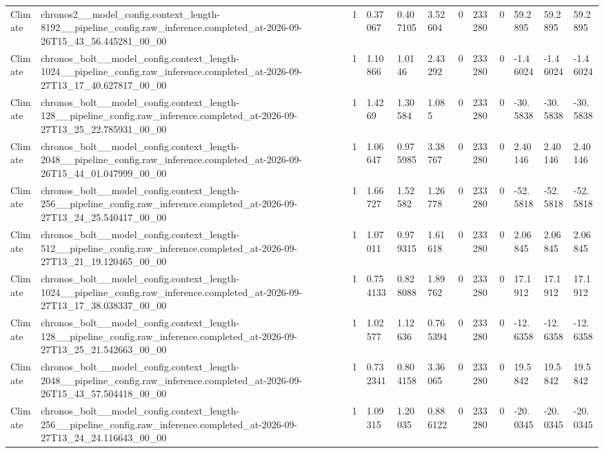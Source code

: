 \begin{tabular}{llllllllllll}
Climate & chronos2\_\_model\_config.context\_length-8192\_\_pipeline\_config.raw\_inference.completed\_at-2026-09-26T15\_43\_56.445281\_00\_00 & 1 & 0.37067 & 0.407105 & 3.52604 & 0 & 233280 & 0 & 59.2895 & 59.2895 & 59.2895 \\
Climate & chronos\_bolt\_\_model\_config.context\_length-1024\_\_pipeline\_config.raw\_inference.completed\_at-2026-09-27T13\_17\_40.627817\_00\_00 & 1 & 1.10866 & 1.0146 & 2.43292 & 0 & 233280 & 0 & -1.46024 & -1.46024 & -1.46024 \\
Climate & chronos\_bolt\_\_model\_config.context\_length-128\_\_pipeline\_config.raw\_inference.completed\_at-2026-09-27T13\_25\_22.785931\_00\_00 & 1 & 1.4269 & 1.30584 & 1.085 & 0 & 233280 & 0 & -30.5838 & -30.5838 & -30.5838 \\
Climate & chronos\_bolt\_\_model\_config.context\_length-2048\_\_pipeline\_config.raw\_inference.completed\_at-2026-09-26T15\_44\_01.047999\_00\_00 & 1 & 1.06647 & 0.975985 & 3.38767 & 0 & 233280 & 0 & 2.40146 & 2.40146 & 2.40146 \\
Climate & chronos\_bolt\_\_model\_config.context\_length-256\_\_pipeline\_config.raw\_inference.completed\_at-2026-09-27T13\_24\_25.540417\_00\_00 & 1 & 1.66727 & 1.52582 & 1.26778 & 0 & 233280 & 0 & -52.5818 & -52.5818 & -52.5818 \\
Climate & chronos\_bolt\_\_model\_config.context\_length-512\_\_pipeline\_config.raw\_inference.completed\_at-2026-09-27T13\_21\_19.120465\_00\_00 & 1 & 1.07011 & 0.979315 & 1.61618 & 0 & 233280 & 0 & 2.06845 & 2.06845 & 2.06845 \\
Climate & chronos\_bolt\_\_model\_config.context\_length-1024\_\_pipeline\_config.raw\_inference.completed\_at-2026-09-27T13\_17\_38.038337\_00\_00 & 1 & 0.754133 & 0.828088 & 1.89762 & 0 & 233280 & 0 & 17.1912 & 17.1912 & 17.1912 \\
Climate & chronos\_bolt\_\_model\_config.context\_length-128\_\_pipeline\_config.raw\_inference.completed\_at-2026-09-27T13\_25\_21.542663\_00\_00 & 1 & 1.02577 & 1.12636 & 0.765394 & 0 & 233280 & 0 & -12.6358 & -12.6358 & -12.6358 \\
Climate & chronos\_bolt\_\_model\_config.context\_length-2048\_\_pipeline\_config.raw\_inference.completed\_at-2026-09-26T15\_43\_57.504418\_00\_00 & 1 & 0.732341 & 0.804158 & 3.36065 & 0 & 233280 & 0 & 19.5842 & 19.5842 & 19.5842 \\
Climate & chronos\_bolt\_\_model\_config.context\_length-256\_\_pipeline\_config.raw\_inference.completed\_at-2026-09-27T13\_24\_24.116643\_00\_00 & 1 & 1.09315 & 1.20035 & 0.886122 & 0 & 233280 & 0 & -20.0345 & -20.0345 & -20.0345 \\

\end{tabular}
